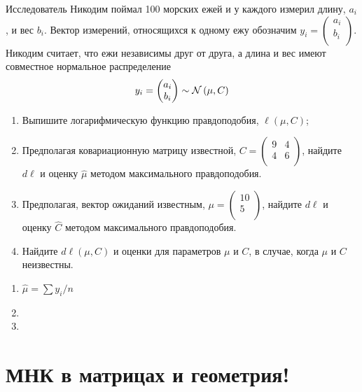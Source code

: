 \begin{problem}
Исследователь Никодим поймал 100 морских ежей и у каждого измерил длину, $a_i$,
и вес $b_i$. Вектор измерений, относящихся к одному ежу обозначим $y_i = \begin{pmatrix}
a_i \\
b_i \\
\end{pmatrix}$. Никодим считает, что ежи независимы друг от друга,
а длина и вес имеют совместное нормальное распределение
\[
y_i = \begin{pmatrix}
a_i \\
b_i \\
\end{pmatrix} \sim \mathcal{N} \left( \mu, C  \right)
\]

\begin{enumerate}
\item Выпишите логарифмическую функцию правдоподобия, $\ell(\mu, C)$;
\item Предполагая ковариационную матрицу известной, $C = \begin{pmatrix}
9 & 4 \\
4 & 6 \\
\end{pmatrix}$,
найдите $d \ell$ и оценку $\hat \mu$ методом максимального правдоподобия.

\item Предполагая, вектор ожиданий известным, $\mu = \begin{pmatrix}
10 \\
5 \\
\end{pmatrix}$,
 найдите $d \ell$ и оценку $\hat C$ методом максимального правдоподобия.


\item Найдите $d \ell(\mu, C)$ и оценки для параметров $\mu$ и $C$,
в случае, когда $\mu$ и $C$ неизвестны.
\end{enumerate}


\begin{sol}
\begin{enumerate}
\item $\hat \mu  = \sum y_i / n$
\item
\item
\end{enumerate}
\end{sol}
\end{problem}




\section{МНК в матрицах и геометрия!}


